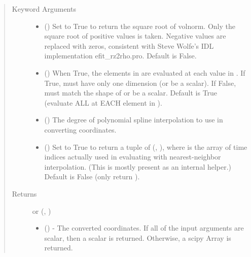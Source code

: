 \documentclass[letterpaper,10pt,english]{sphinxmanual}
\begin{document}
\begin{fulllineitems}
\begin{fulllineitems}
\begin{quote}
\begin{description}
\begin{itemize}
\end{itemize}

\item[{Keyword Arguments}] \leavevmode\begin{itemize}
\item {} 
 () \textendash{} Set to True to return the square root of volnorm.
Only the square root of positive values is taken. Negative
values are replaced with zeros, consistent with Steve Wolfe’s
IDL implementation efit\_rz2rho.pro. Default is False.

\item {} 
 () \textendash{} When True, the elements in  are evaluated
at each value in . If True,  must have only one dimension
(or be a scalar). If False,  must match the shape of 
or be a scalar. Default is True (evaluate ALL  at EACH
element in ).

\item {} 
 () \textendash{} The degree of polynomial spline interpolation to
use in converting coordinates.

\item {} 
 () \textendash{} Set to True to return a tuple of (,
), where  is the array of time indices
actually used in evaluating  with nearest-neighbor
interpolation. (This is mostly present as an internal helper.)
Default is False (only return ).

\end{itemize}

\item[{Returns}] \leavevmode

 or (, )
\begin{itemize}
\item {} 
 () - The converted coordinates. If
all of the input arguments are scalar, then a scalar is returned.
Otherwise, a scipy Array is returned.


\end{itemize}
\end{description}
\end{quote}
\end{fulllineitems}
\end{fulllineitems}
\end{document}
